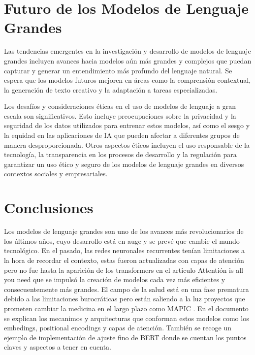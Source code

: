       
\section{Futuro de los Modelos de Lenguaje Grandes}
   Las tendencias emergentes en la investigación y desarrollo de modelos de lenguaje grandes \cite{Shaip-LLM} incluyen avances hacia modelos aún más grandes y complejos que puedan capturar y generar un entendimiento más profundo del lenguaje natural. Se espera que los modelos futuros mejoren en áreas como la comprensión contextual, la generación de texto creativo y la adaptación a tareas especializadas.

   Los desafíos y consideraciones éticas en el uso de modelos de lenguaje a gran escala son significativos. Esto incluye preocupaciones sobre la privacidad y la seguridad de los datos utilizados para entrenar estos modelos, así como el sesgo y la equidad en las aplicaciones de IA que pueden afectar a diferentes grupos de manera desproporcionada. Otros aspectos éticos incluyen el uso responsable de la tecnología, la transparencia en los procesos de desarrollo y la regulación para garantizar un uso ético y seguro de los modelos de lenguaje grandes en diversos contextos sociales y empresariales.
\section{Conclusiones}

Los modelos de lenguaje grandes son uno de los avances más revolucionarios de los últimos años, cuyo desarrollo está en auge y se prevé que cambie el mundo tecnológico. En el pasado, las redes neuronales recurrentes tenían limitaciones a la hora de recordar el contexto, estas fueron actualizadas con capas de atención pero no fue hasta la aparición de los transformers en el articulo Attentión is all you need \cite{vaswani2023attention} que se impulsó la creación de modelos cada vez más eficientes y consecuentemente más grandes. El campo de la salud está en una fase prematura debido a las limitaciones burocráticas pero están saliendo a la luz proyectos que prometen cambiar la medicina en el largo plazo como MAPIC \cite{UMA}. En el documento se explican los mecanimos y arquitecturas que conforman estos modelos como los embedings, positional encodings y capas de atención. También se recoge un ejemplo de implementación de ajuste fino de BERT donde se cuentan los puntos claves y aspectos a tener en cuenta.

\listoffigures








